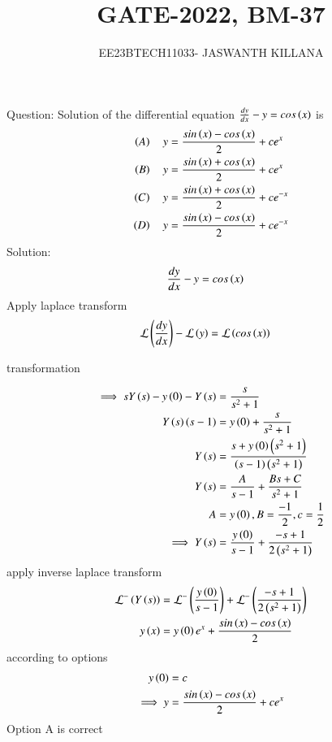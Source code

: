 \documentclass[journal,12pt,twocolumn]{IEEEtran}
\theoremstyle{remark}
\begin{document}

\vspace{3cm}

\title{GATE-2022, BM-37}
\author{EE23BTECH11033- JASWANTH KILLANA}
\maketitle
\newpage
\bigskip

\renewcommand{\thefigure}{\theenumi}
\renewcommand{\thetable}{\theenumi}
Question: Solution of the differential equation $\frac{dy}{dx}-y=cos\left(x\right)$ is
\begin{align}
\left(A\right)\quad y&=\frac{sin\left(x\right)-cos\left(x\right)}{2}+ce^x\\
\left(B\right)\quad y&=\frac{sin\left(x\right)+cos\left(x\right)}{2}+ce^x\\
\left(C\right)\quad y&=\frac{sin\left(x\right)+cos\left(x\right)}{2}+ce^{-x}\\
\left(D\right)\quad y&=\frac{sin\left(x\right)-cos\left(x\right)}{2}+ce^{-x}
\end{align}
Solution:\begin{align}
\frac{dy}{dx}-y&=cos\left(x\right)
\end{align}
Apply laplace transform
\begin{align}
\mathcal{L}\left(\frac{dy}{dx}\right)-\mathcal{L}\left(y\right)&=\mathcal{L}\left({cos\left(x\right)}\right)
\end{align}
\begin{table}[!ht]
 \centering
  
   \caption{transformation}
   \end{table}
\begin{align}
\implies sY\left(s\right)-y\left(0\right)-Y\left(s\right)&=\frac{s}{s^{2}+1}\\
Y\left(s\right)\left(s-1\right)&=y\left(0\right)+\frac{s}{s^{2}+1}\\
Y\left(s\right)&=\frac{s+y\left(0\right)\left(s^{2}+1\right)}{\left(s-1\right)\left(s^{2}+1\right)}\\
Y\left(s\right)&=\frac{A}{s-1}+\frac{Bs+C}{s^2+1}\\
A&=y\left(0\right),B=\frac{-1}{2},c=\frac{1}{2}\\
\implies Y\left(s\right)&=\frac{y\left(0\right)}{s-1}+\frac{-s+1}{2\left(s^2+1\right)}
\end{align}
apply inverse laplace transform
\begin{align}
\mathcal{L^-}\left(Y\left(s\right)\right)&=\mathcal{L^-}\left(\frac{y\left(0\right)}{s-1}\right)+\mathcal{L^-}\left(\frac{-s+1}{2\left(s^2+1\right)}\right)\\
y\left(x\right)&=y\left(0\right)e^x+\frac{sin\left(x\right)-cos\left(x\right)}{2}
\end{align}
according to options 
\begin{align}
 y\left(0\right)&=c\\
 \implies y&=\frac{sin\left(x\right)-cos\left(x\right)}{2}+ce^x
\end{align}
Option A is correct
\end{document}
